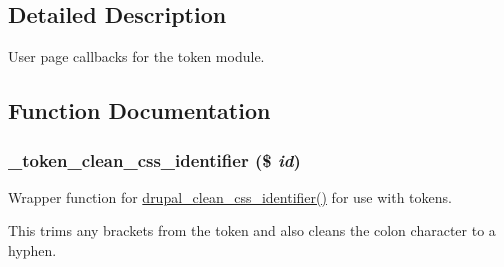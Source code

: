 \subsection{Detailed Description}
User page callbacks for the token module. 

\subsection{Function Documentation}
\hypertarget{token_8pages_8inc_ae945ed316363ca5b9c9b56c6554c493c}{
\subsubsection[{\_\-token\_\-clean\_\-css\_\-identifier}]{\setlength{\rightskip}{0pt plus 5cm}\_\-token\_\-clean\_\-css\_\-identifier (\$ {\em id})}}
\label{token_8pages_8inc_ae945ed316363ca5b9c9b56c6554c493c}
Wrapper function for \hyperlink{common_8inc_a71bc20ece521646a633b65868a441d26}{drupal\_\-clean\_\-css\_\-identifier()} for use with tokens.

This trims any brackets from the token and also cleans the colon character to a hyphen.

